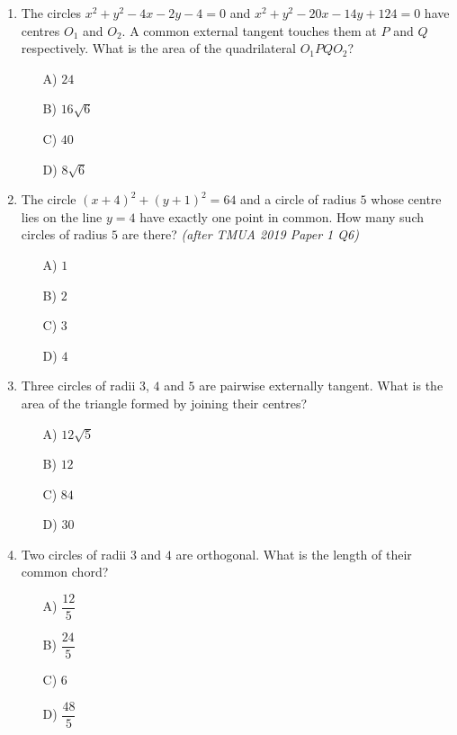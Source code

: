 \documentclass[11pt,a4paper]{article}
\begin{document}
\begin{enumerate}

\item The circles $x^2+y^2-4x-2y-4=0$ and $x^2+y^2-20x-14y+124=0$ have centres $O_1$ and $O_2$. A common external tangent touches them at $P$ and $Q$ respectively. What is the area of the quadrilateral $O_1PQO_2$?
\begin{itemize}
\item[A)] $24$
\item[B)] $16\sqrt6$
\item[C)] $40$
\item[D)] $8\sqrt6$
\end{itemize}

\item The circle $(x+4)^2+(y+1)^2=64$ and a circle of radius $5$ whose centre lies on the line $y=4$ have exactly one point in common. How many such circles of radius $5$ are there? \textit{\small(after TMUA 2019 Paper 1 Q6)}
\begin{itemize}
\item[A)] $1$
\item[B)] $2$
\item[C)] $3$
\item[D)] $4$
\end{itemize}

\item Three circles of radii $3$, $4$ and $5$ are pairwise externally tangent. What is the area of the triangle formed by joining their centres?
\begin{itemize}
\item[A)] $12\sqrt5$
\item[B)] $12$
\item[C)] $84$
\item[D)] $30$
\end{itemize}

\item Two circles of radii $3$ and $4$ are orthogonal. What is the length of their common chord?
\begin{itemize}
\item[A)] $\dfrac{12}{5}$
\item[B)] $\dfrac{24}{5}$
\item[C)] $6$
\item[D)] $\dfrac{48}{5}$
\end{itemize}


\end{enumerate}
\end{document}
